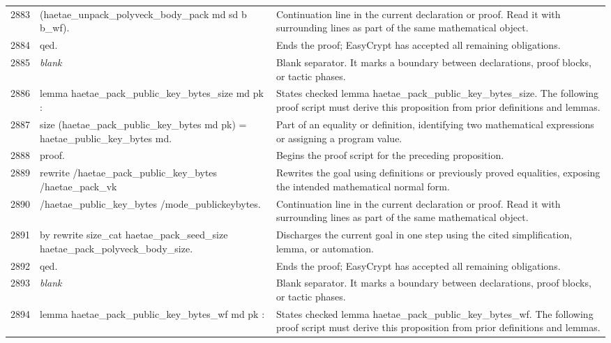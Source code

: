 \documentclass[10pt]{article}
\begin{document}
\begin{longtable}{r L{0.53\textwidth} L{0.37\textwidth}}
2883 & {\ttfamily\scriptsize            (haetae\_unpack\_polyveck\_body\_pack md sd b b\_wf).} & Continuation line in the current declaration or proof.  Read it with surrounding lines as part of the same mathematical object. \\
2884 & {\ttfamily\scriptsize qed.} & Ends the proof; EasyCrypt has accepted all remaining obligations. \\
2885 & {\ttfamily\scriptsize \emph{blank}} & Blank separator.  It marks a boundary between declarations, proof blocks, or tactic phases. \\
2886 & {\ttfamily\scriptsize lemma haetae\_pack\_public\_key\_bytes\_size md pk :} & States checked lemma haetae\_pack\_public\_key\_bytes\_size.  The following proof script must derive this proposition from prior definitions and lemmas. \\
2887 & {\ttfamily\scriptsize   size (haetae\_pack\_public\_key\_bytes md pk) = haetae\_public\_key\_bytes md.} & Part of an equality or definition, identifying two mathematical expressions or assigning a program value. \\
2888 & {\ttfamily\scriptsize proof.} & Begins the proof script for the preceding proposition. \\
2889 & {\ttfamily\scriptsize rewrite /haetae\_pack\_public\_key\_bytes /haetae\_pack\_vk} & Rewrites the goal using definitions or previously proved equalities, exposing the intended mathematical normal form. \\
2890 & {\ttfamily\scriptsize         /haetae\_public\_key\_bytes /mode\_publickeybytes.} & Continuation line in the current declaration or proof.  Read it with surrounding lines as part of the same mathematical object. \\
2891 & {\ttfamily\scriptsize by rewrite size\_cat haetae\_pack\_seed\_size haetae\_pack\_polyveck\_body\_size.} & Discharges the current goal in one step using the cited simplification, lemma, or automation. \\
2892 & {\ttfamily\scriptsize qed.} & Ends the proof; EasyCrypt has accepted all remaining obligations. \\
2893 & {\ttfamily\scriptsize \emph{blank}} & Blank separator.  It marks a boundary between declarations, proof blocks, or tactic phases. \\
2894 & {\ttfamily\scriptsize lemma haetae\_pack\_public\_key\_bytes\_wf md pk :} & States checked lemma haetae\_pack\_public\_key\_bytes\_wf.  The following proof script must derive this proposition from prior definitions and lemmas. \\

\end{longtable}
\end{document}
